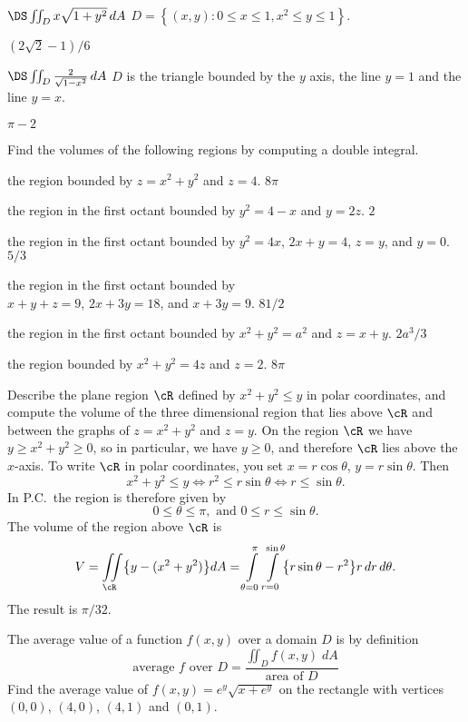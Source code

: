 \noindent\parbox{0.8\textwidth}{%
\subprob $\DS \iint_D x\sqrt{1+y^2}\,dA $ 
\hfill$D = \left\{ (x,y) : 0\le x\le1, x^2\le y\le1 \right\}$.
}
\answer
$(2\sqrt2-1)/6$
\endanswer

\noindent\parbox{0.8\textwidth}{%
\subprob $\DS \iint_D {2\over\sqrt{1-x^2}}\,dA $ 
\hfill$D$ is the triangle bounded by the $y$ axis, the line $y=1$ and
the line $y=x$.
}
\answer
$\pi-2$
\endanswer

\problem Find the volumes of the following regions by computing a double integral.

\subprob the region bounded by $z=x^2+y^2$ and $z=4$. 
\answer
$8\pi$
\endanswer


\subprob the region in the first octant bounded by $y^2=4-x$ and $y=2z$.
\answer
$2$
\endanswer


\subprob the region in the first octant bounded by $y^2=4x$, $2x+y=4$, $z=y$,
and $y=0$.
\answer
$5/3$
\endanswer

\subprob the region in the first octant bounded by\\
$x+y+z=9$, $2x+3y=18$, and $x+3y=9$.
\answer
$81/2$
\endanswer

\subprob the region in the first octant bounded by $x^2+y^2=a^2$ and $z=x+y$.
\answer
$2a^3/3$
\endanswer

\subprob the region bounded by $x^2+y^2=4z$ and $z=2$. 
\answer
$8\pi$
\endanswer

\subprob Describe the plane region $\cR$ defined by $x^2+y^2 \leq y$ in polar coordinates, and compute the volume of the three dimensional region that lies above $\cR$ and between the graphs of $z=x^2+y^2$ and $z=y$.
\answer
On the region $\cR$ we have $y\geq x^2+y^2 \geq0$, so in particular, we have $y\geq0$, and therefore  $\cR$ lies above the $x$-axis.
To write $\cR$ in polar coordinates, you set $x=r\cos\theta$, $y=r\sin\theta$.  Then
\[
x^2+y^2 \leq y \iff r^2 \leq r\sin\theta \iff r\leq \sin\theta.
\]
In P.C.~the region is therefore given by
\[
0\leq\theta\leq \pi, \text{ and }0\leq r\leq \sin\theta.
\]
The volume of the region above $\cR$ is
\[
V = \iint\limits_\cR \bigl\{y - (x^2+y^2)\bigr\} dA
=\int\limits_{\theta=0}^\pi \int\limits_{r=0}^{\sin\theta}
\bigl\{r\sin\theta - r^2\bigr\} r\, dr\, d\theta.
\]
The result is $\pi/32$.
\endanswer

\problem The average value of a function $f(x, y)$ over a domain $D$ is by definition
\[
\text{average $f$ over $D$}
=
\frac{\iint_D f(x, y) \;  dA}{\text{area of }D}
\]
Find the average value of $f(x,y)=e^y\sqrt{x+e^y}$ on the rectangle
with vertices $(0,0)$, $(4,0)$, $(4,1)$ and $(0,1)$.

